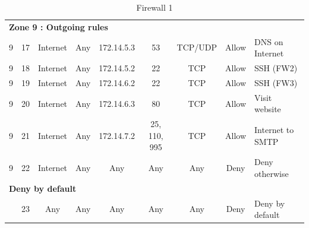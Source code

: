 \documentclass[a4paper,titlepage]{article}
\begin{document}
\begin{table}[h]
\begin{tabular}{c|c|cc|cc|ccl}
		\hline
		\multicolumn{9}{l}{\textbf{Zone 9 : Outgoing rules}}\\
		9 & 17 & Internet & Any & 172.14.5.3 & 53 & TCP/UDP & Allow & DNS on Internet\\
		9 & 18 & Internet & Any & 172.14.5.2 & 22 & TCP & Allow & SSH (FW2)\\
		9 & 19 & Internet & Any & 172.14.6.2 & 22 & TCP & Allow & SSH (FW3)\\
		9 & 20 & Internet & Any & 172.14.6.3 & 80 & TCP & Allow & Visit website\\
		9 & 21 & Internet & Any & 172.14.7.2 & 25, 110, 995 & TCP & Allow & Internet to SMTP\\
		9 & 22 & Internet & Any & Any & Any & Any & Deny & Deny otherwise\\

		\hline
		\multicolumn{9}{l}{\textbf{Deny by default}}\\
		  & 23 & Any & Any & Any & Any & Any & Deny & Deny by default\\
		\hline
	\end{tabular}
	\caption{Firewall 1}
\end{table}

\end{document}
